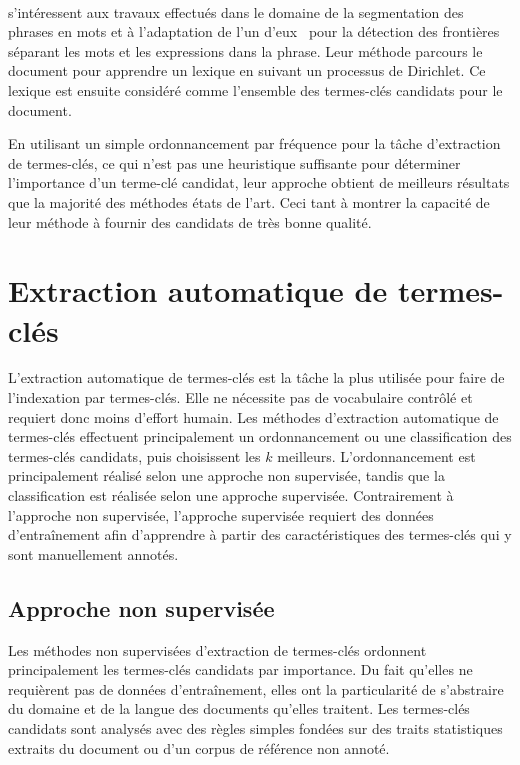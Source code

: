     ~\\ s'intéressent aux travaux
    effectués dans le domaine de la segmentation des phrases en mots et à
    l'adaptation de l'un d'eux~\cite{goldwater2009bayesianwordsegmentation} pour
    la détection des frontières séparant les mots et les expressions dans la
    phrase. Leur méthode parcours le document pour apprendre un lexique en
    suivant un processus de Dirichlet. Ce lexique est ensuite considéré comme
    l'ensemble des termes-clés candidats pour le document.

    En utilisant un simple ordonnancement par fréquence pour la tâche
    d'extraction de termes-clés, ce qui n'est pas une heuristique suffisante
    pour déterminer l'importance d'un terme-clé candidat, leur approche obtient
    de meilleurs résultats que la majorité des méthodes états de l'art. Ceci
    tant à montrer la capacité de leur méthode à fournir des candidats de très
    bonne qualité.


  \section{Extraction automatique de termes-clés}
  \label{sec:main-state_of_the_art-automatic_keyphrase_extraction}
    L'extraction automatique de termes-clés est la tâche la plus utilisée pour
    faire de l'indexation par termes-clés. Elle ne nécessite pas de vocabulaire
    contrôlé et requiert donc moins d'effort humain. Les méthodes d'extraction
    automatique de termes-clés effectuent principalement un ordonnancement ou
    une classification des termes-clés candidats, puis choisissent les $k$
    meilleurs. L'ordonnancement est principalement réalisé selon une approche
    non supervisée, tandis que la classification est réalisée selon une approche
    supervisée. Contrairement à l'approche non supervisée, l'approche supervisée
    requiert des données d'entraînement afin d'apprendre à partir des
    caractéristiques des termes-clés qui y sont manuellement annotés.

    \subsection{Approche non supervisée}
    \label{subsec:main-state_of_the_art-automatic_keyphrase_extraction-unsupervised_keyphrase_extraction}
      Les méthodes non supervisées d'extraction de termes-clés ordonnent
      principalement les termes-clés candidats par importance. Du fait qu'elles
      ne requièrent pas de données d'entraînement, elles ont la particularité de
      s'abstraire du domaine et de la langue des documents qu'elles traitent.
      Les termes-clés candidats sont analysés avec des règles simples fondées
      sur des traits statistiques extraits du document ou d'un corpus de
      référence non annoté.

